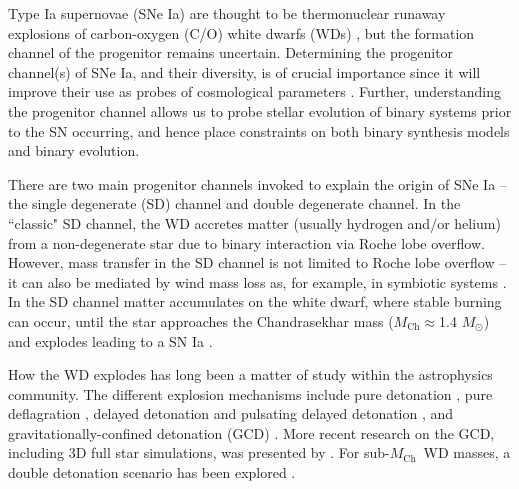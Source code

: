\documentclass[useAMS,usenatbib,useasmath]{mnras}
\newcommand{\Mch}{\hbox{$M_{\text{Ch}}$}}
\begin{document}
Type Ia supernovae (SNe Ia) are thought to be thermonuclear runaway explosions of carbon-oxygen (C/O) white dwarfs (WDs) \citep{Hoyle1960}, but the formation channel of the progenitor remains uncertain. Determining the progenitor channel(s) of SNe Ia, and their diversity, is of crucial importance since it will improve their use as probes of cosmological parameters \citep{Riess1998,Perlmutter1999}. Further, understanding the progenitor channel allows us to probe stellar evolution of binary systems prior to the SN occurring, and hence place constraints on both binary synthesis models and binary evolution.  
 

There are two main progenitor channels invoked to explain the origin of SNe Ia -- the single degenerate (SD) channel and double degenerate channel. In the ``classic" SD channel, the WD accretes matter (usually hydrogen and/or helium) from a non-degenerate star due to binary interaction via Roche lobe overflow.
However, mass transfer in the SD channel is not limited to Roche lobe overflow --  it can also be mediated by wind mass loss as, for example, in symbiotic systems \citep[see][for a review]{Maoz2014}. In the SD channel matter accumulates on the white dwarf, where stable burning can occur, until the star approaches the Chandrasekhar mass (\Mch$\approx$1.4 $M_\odot$) and explodes leading to a SN Ia \citep{WhelanIben1973,Nomoto1982a}.

How the WD explodes has long been a matter of study within the astrophysics community. The different explosion mechanisms include pure detonation \citep{Arnett1969,Sim_2010}, pure deflagration \citep{Nomoto_1976}, delayed detonation and pulsating delayed detonation \citep{Khokhlov1991a,Khokhlov1991b, Gamezo2005,Livne2005,Ropke2007,Jackson2010,Seitenzahl2013}, and gravitationally-confined detonation (GCD) \citep{Plewa2004}. More recent research on the GCD, including 3D full star simulations, was presented by \cite{Seitenzahl2016}. For sub-\Mch\ WD masses, a double detonation scenario has been explored \citep{Woosley1994,Livne1995, Fink2007,Fink2010}. 
\end{document}
